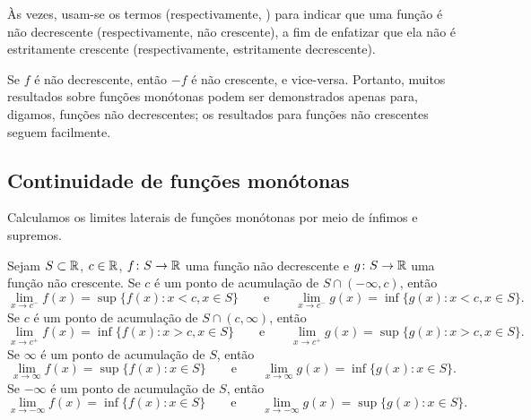 Às vezes, usam-se os termos \emph{}
(respectivamente, \emph{})
para indicar que uma função é não decrescente (respectivamente, não crescente), a fim de enfatizar
que ela não é estritamente crescente (respectivamente, estritamente decrescente).

Se $f$ é não decrescente, então $-f$ é não crescente, e vice-versa. Portanto,
muitos resultados sobre funções monótonas podem ser demonstrados apenas para,
digamos, funções não decrescentes; os resultados para funções não crescentes seguem facilmente.

\subsection{Continuidade de funções monótonas}

Calculamos os limites laterais de funções monótonas por meio de ínfimos e supremos.

\begin{prop} \label{prop:monotlimits}
Sejam $S \subset {\mathbb{R}}$, $c \in {\mathbb{R}}$,
$f \colon S \to {\mathbb{R}}$ uma função não decrescente
e
$g \colon S \to {\mathbb{R}}$ uma função não crescente.
Se $c$ é um ponto de acumulação de $S \cap (-\infty,c)$, então
\begin{equation*}
\lim_{x \to c^-} f(x) = \sup \{ f(x) : x < c, x \in S \}
\qquad \text{e} \qquad
\lim_{x \to c^-} g(x) = \inf \{ g(x) : x < c, x \in S \} .
\end{equation*}
Se $c$ é um ponto de acumulação de $S \cap (c,\infty)$, então
\begin{equation*}
\lim_{x \to c^+} f(x) = \inf \{ f(x) : x > c, x \in S \}
\qquad \text{e} \qquad
\lim_{x \to c^+} g(x) = \sup \{ g(x) : x > c, x \in S \} .
\end{equation*}
Se $\infty$ é um ponto de acumulação de $S$, então
\begin{equation*}
\lim_{x \to \infty} f(x) = \sup \{ f(x) : x \in S \}
\qquad \text{e} \qquad
\lim_{x \to \infty} g(x) = \inf \{ g(x) : x \in S \} .
\end{equation*}
Se $-\infty$ é um ponto de acumulação de $S$, então
\begin{equation*}
\lim_{x \to -\infty} f(x) = \inf \{ f(x) : x \in S \}
\qquad \text{e} \qquad
\lim_{x \to -\infty} g(x) = \sup \{ g(x) : x \in S \} .
\end{equation*}
\end{prop}

